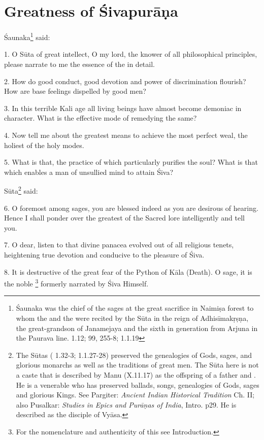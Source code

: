 \chapter{Greatness of Śivapurāṇa}

Śaunaka\footnote{Śaunaka was the chief of the sages at the great sacrifice in
Naimiṣa forest to whom the  and the  were recited by
the Sūta in the reign of Adhisīmakṛṣṇa, the great-grandson of Janamejaya and
the sixth in generation from Arjuna in the Paurava line.  1.12;
99, 255-8;  1.1.19} said:

1. O Sūta of great intellect, O my lord, the knower of all philosophical
principles, please narrate to me the essence of the  in detail.

2. How do good conduct, good devotion and power of discrimination flourish? How
are base feelings dispelled by good men?

3. In this terrible Kali age all living beings have almost become demoniac in
character. What is the effective mode of remedying the same?

4. Now tell me about the greatest means to achieve the most perfect weal,
the holiest of the holy modes.

5. What is that, the practice of which particularly purifies the soul? What is
that which enables a man of unsullied mind to attain Śiva?

Sūta\footnote{The Sūtas ( 1.32-3;  1.1.27-28)
preserved the genealogies of Gods, sages, and glorious monarchs as well as
the traditions of great men. The Sūta here is not a caste that is described by
Manu (X.11.17) as the offspring of a  father and . He is a venerable  who has preserved ballads, songs,
genealogies of Gods, sages and glorious Kings. See Pargiter: \emph{Ancient
Indian Historical Tradition} Ch. II; also Pusalkar: \emph{Studies in Epics and
Purāṇas of India}, Intro. p29. He is described as the disciple of Vyāsa.} said:

6. O foremost among sages, you are blessed indeed as you are desirous of hearing.
Hence I shall ponder over the greatest of the Sacred lore intelligently and
tell you.

7. O dear, listen to that divine panacea evolved out of all religious tenets,
heightening true devotion and conducive to the pleasure of Śiva.

8. It is destructive of the great fear of the Python of Kāla (Death). O sage,
it is the noble \footnote{For the nomenclature and authenticity
of this  see Introduction.} formerly narrated by Śiva Himself.

